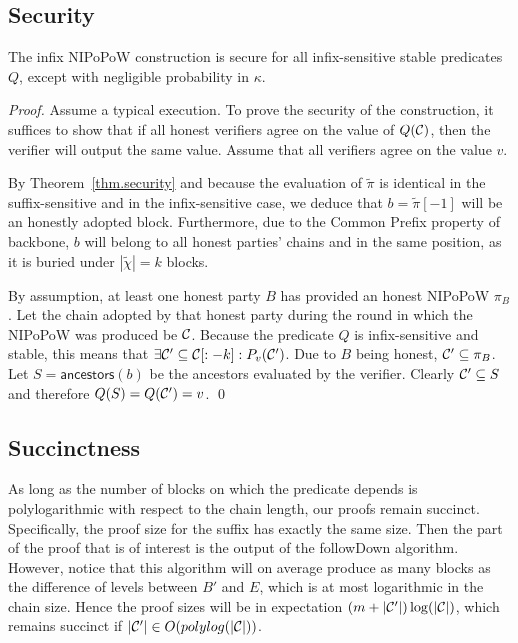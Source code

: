 \subsection{Security}
\begin{theorem}
The infix NIPoPoW construction is secure for all infix-sensitive stable
predicates $Q$, except with negligible probability in $\kappa$.
\end{theorem}
\begin{proof}
Assume a typical execution. To prove the security of the construction, it
suffices to show that if all honest verifiers agree on the value of $Q(\mathcal{C})$,
then the verifier will output the same value. Assume that all verifiers agree on
the value $v$.

By Theorem~\ref{thm.security} and because the evaluation of $\tilde\pi$ is
identical in the suffix-sensitive and in the infix-sensitive case, we deduce
that $b = \tilde\pi[-1]$ will be an honestly adopted block. Furthermore, due to
the Common Prefix property of backbone, $b$ will belong to all honest parties'
chains and in the same position, as it is buried under $|\tilde\chi| = k$
blocks.

By assumption, at least one honest party $B$ has provided an honest NIPoPoW
$\pi_B$. Let the chain adopted by that honest party during the round in which
the NIPoPoW was produced be $\mathcal{C}$. Because the predicate $Q$ is infix-sensitive
and stable, this means that $\exists \mathcal{C}' \subseteq \mathcal{C}[:-k]:
P_v(\mathcal{C}')$. Due to $B$ being honest, $\mathcal{C}' \subseteq \pi_B$. Let
$S = \textsf{ancestors}(b)$ be the ancestors evaluated by the verifier. Clearly
$\mathcal{C}' \subseteq S$ and therefore $Q(S) = Q(\mathcal{C}') = v$.
\qed
\end{proof}

\subsection{Succinctness}
As long as the number of blocks on which the predicate depends is
polylogarithmic with respect to the chain length, our proofs remain succinct.
Specifically, the proof size for the suffix has exactly the same size. Then
the part of the proof that is of interest is the output of the followDown
algorithm. However, notice that this algorithm will on average produce as many
blocks as the difference of levels between $B'$ and $E$, which is at most
logarithmic in the chain size. Hence the proof sizes will be in expectation
$(m + |\mathcal{C}'|)\log(|\mathcal{C}|)$, which remains succinct if $|\mathcal{C}'| \in
O(polylog(|\mathcal{C}|))$.

